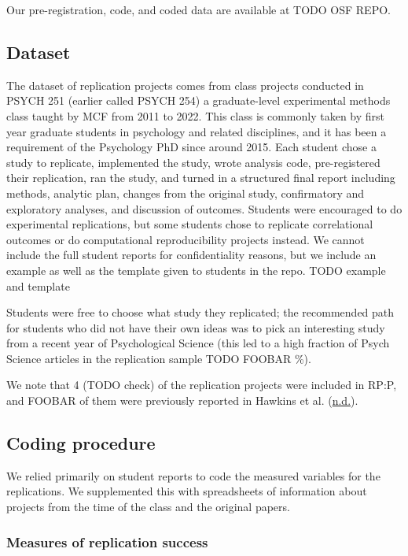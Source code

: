 \documentclass[
  english,
  a4paper,
]{article}
\begin{document}
Our pre-registration, code, and coded data are available at TODO OSF REPO.

\hypertarget{dataset}{%
\subsection{Dataset}\label{dataset}}

The dataset of replication projects comes from class projects conducted in PSYCH 251 (earlier called PSYCH 254) a graduate-level experimental methods class taught by MCF from 2011 to 2022. This class is commonly taken by first year graduate students in psychology and related disciplines, and it has been a requirement of the Psychology PhD since around 2015. Each student chose a study to replicate, implemented the study, wrote analysis code, pre-registered their replication, ran the study, and turned in a structured final report including methods, analytic plan, changes from the original study, confirmatory and exploratory analyses, and discussion of outcomes. Students were encouraged to do experimental replications, but some students chose to replicate correlational outcomes or do computational reproducibility projects instead. We cannot include the full student reports for confidentiality reasons, but we include an example as well as the template given to students in the repo. TODO example and template

Students were free to choose what study they replicated; the recommended path for students who did not have their own ideas was to pick an interesting study from a recent year of Psychological Science (this led to a high fraction of Psych Science articles in the replication sample TODO FOOBAR \%).

We note that 4 (TODO check) of the replication projects were included in RP:P, and FOOBAR of them were previously reported in Hawkins et al. (\protect\hyperlink{ref-hawkins}{n.d.}).

\hypertarget{coding-procedure}{%
\subsection{Coding procedure}\label{coding-procedure}}

We relied primarily on student reports to code the measured variables for the replications. We supplemented this with spreadsheets of information about projects from the time of the class and the original papers.

\hypertarget{measures-of-replication-success}{%
\subsubsection{Measures of replication success}\label{measures-of-replication-success}}
\end{document}
